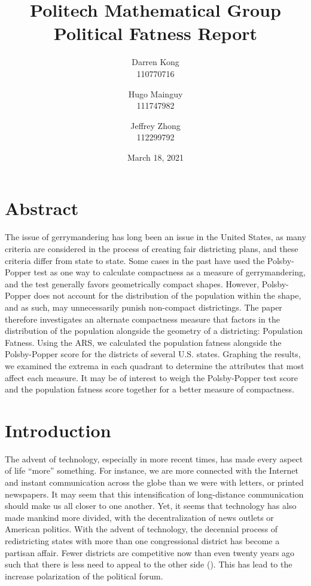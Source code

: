 \documentclass[letterpaper]{article}
\title{
	\textbf{Politech Mathematical Group} \\ 
	\vspace{2ex} 
	Political Fatness Report
	\vspace{2ex}
}
\author{
	Darren Kong \\ 110770716
	\and 
	Hugo Mainguy \\ 111747982
	\and 
	Jeffrey Zhong \\ 112299792
	\vspace{3ex}
}
\date{March 18, 2021}
\begin{document}
\begin{titlepage}
\maketitle
\thispagestyle{empty}
\end{titlepage}

\section{Abstract}
The issue of gerrymandering has long been an issue in the United States, as many criteria are considered in the process of creating fair districting plans, and these criteria differ from state to state. Some cases in the past have used the Polsby-Popper test as one way to calculate compactness as a measure of gerrymandering, and the test generally favors geometrically compact shapes. However, Polsby-Popper does not account for the distribution of the population within the shape, and as such, may unnecessarily punish non-compact districtings. The paper therefore investigates an alternate compactness measure that factors in the distribution of the population alongside the geometry of a districting: Population Fatness. Using the ARS, we calculated the population fatness alongside the Polsby-Popper score for the districts of several U.S. states. Graphing the results, we examined the extrema in each quadrant to determine the attributes that most affect each measure. It may be of interest to weigh the Polsby-Popper test score and the population fatness score together for a better measure of compactness. 


\section{Introduction}

The advent of technology, especially in more recent times, has made every aspect of life “more” something. For instance, we are more connected with the Internet and instant communication across the globe than we were with letters, or printed newspapers. It may seem that this intensification of long-distance communication should make us all closer to one another. Yet, it seems that technology has also made mankind more divided, with the decentralization of news outlets or American politics. With the advent of technology, the decennial process of redistricting states with more than one congressional district has become a partisan affair. Fewer districts are competitive now than even twenty years ago such that there is less need to appeal to the other side (\cite{cook}). This has lead to the increase polarization of the political forum.
\end{document}
